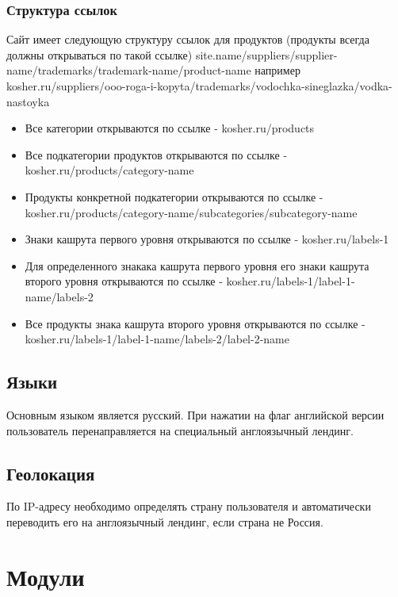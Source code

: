 \documentclass[DIV=calc, paper=a4, fontsize=11pt]{scrartcl} %
\begin{document}
\subsubsection{Структура ссылок}
Сайт имеет следующую структуру ссылок для продуктов (продукты всегда должны открываться по такой ссылке)
site.name/suppliers/supplier-name/trademarks/trademark-name/product-name
например
kosher.ru/suppliers/ooo-roga-i-kopyta/trademarks/vodochka-sineglazka/vodka-nastoyka

\begin{itemize}
	\item Все категории открываются по ссылке - kosher.ru/products
	\item Все подкатегории продуктов открываются по ссылке - kosher.ru/products/category-name
	\item Продукты конкретной подкатегории открываются по ссылке - kosher.ru/products/category-name/subcategories/subcategory-name
	\item Знаки кашрута первого уровня открываются по ссылке - kosher.ru/labels-1
	\item Для определенного знакака кашрута первого уровня его знаки кашрута второго уровня открываются по ссылке - kosher.ru/labels-1/label-1-name/labels-2
	\item Все продукты знака кашрута второго уровня открываются по ссылке - kosher.ru/labels-1/label-1-name/labels-2/label-2-name
\end{itemize}

\subsection{Языки}
Основным языком является русский. При нажатии на флаг английской версии пользователь перенаправляется на специальный англоязычный лендинг.

\subsection{Геолокация}
По IP-адресу необходимо определять страну пользователя и автоматически переводить его на англоязычный лендинг, если страна не Россия. 

\section{Модули}
\end{document}
